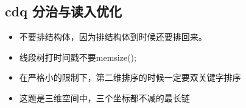 \documentclass[landscape]{report}
\newcommand{\includecode}[2][c]{}
\begin{document}
\begin{flushleft}
\begin{multicols}{2}
\section{ cdq 分治与读入优化}
\begin{itemize}

\item 不要排结构体，因为排结构体到时候还要排回来。
\item 线段树打时间戳不要memsize();
\item 在严格小的限制下，第二维排序的时候一定要双关键字排序
\item 这题是三维空间中，三个坐标都不减的最长链

\end{itemize}
\includecode[c++]{hdu4742.cpp}
\end{multicols}
\end{flushleft}
\end{document}
